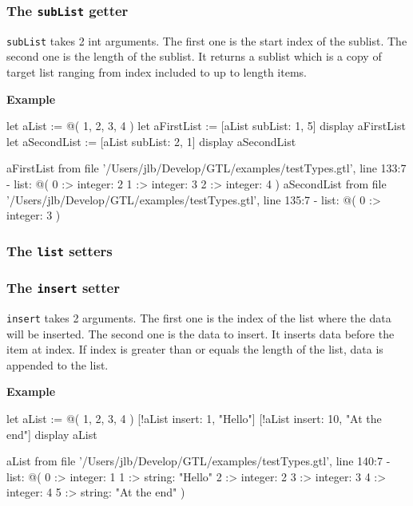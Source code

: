 \documentclass[10pt,openright,twosides]{report}
\newcommand{\gtlarg}[1]{{\footnotesize\ttfamily\colorbox{light-blue}{#1}}}
\newcommand{\gtlinline}[1]{\colorbox{light-blue}{\lstinline[language=gtl]{#1}}}
\newcommand{\example}{\vspace{.75em}\noindent\textbf{Example}\vspace{0em}}
\begin{document}
\subsubsection{The \texttt{subList} getter}

\gtlinline{subList} takes 2 int arguments. The first one is the start \gtlarg{index} of the sublist. The second one is the \gtlarg{length} of the sublist. It returns a sublist which is a copy of target list ranging from \gtlarg{index} included to up to \gtlarg{length} items.

\example
\begin{gtl}
let aList := @( 1, 2, 3, 4 )
let aFirstList := [aList subList: 1, 5]
display aFirstList
let aSecondList := [aList subList: 2, 1]
display aSecondList
\end{gtl}
\begin{console}
aFirstList from file '/Users/jlb/Develop/GTL/examples/testTypes.gtl', line 133:7
  - list: @(
    0 :>
        integer: 2
    1 :>
        integer: 3
    2 :>
        integer: 4
)
aSecondList from file '/Users/jlb/Develop/GTL/examples/testTypes.gtl', line 135:7
  - list: @(
    0 :>
        integer: 3
)
\end{console}

\subsubsection{The \texttt{list} setters}

\subsubsection{The \texttt{insert} setter}

\gtlinline{insert} takes 2 arguments. The first one is the \gtlarg{index} of the list where the data will be inserted. The second one is the \gtlarg{data} to insert. It inserts \gtlarg{data} before the item at \gtlarg{index}. If \gtlarg{index} is greater than or equals the length of the list, \gtlarg{data} is appended to the list.

\example
\begin{gtl}
let aList := @( 1, 2, 3, 4 )
[!aList insert: 1, "Hello"]
[!aList insert: 10, "At the end"]
display aList
\end{gtl}
\begin{console}
aList from file '/Users/jlb/Develop/GTL/examples/testTypes.gtl', line 140:7
  - list: @(
    0 :>
        integer: 1
    1 :>
        string: "Hello"
    2 :>
        integer: 2
    3 :>
        integer: 3
    4 :>
        integer: 4
    5 :>
        string: "At the end"
)
\end{console}
\end{document}
